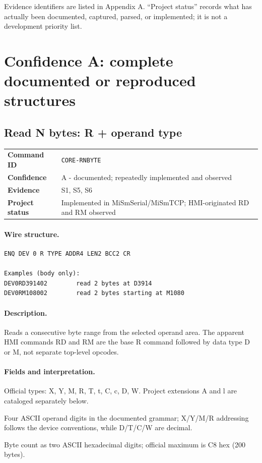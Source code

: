 \documentclass[10pt,letterpaper]{article}
\begin{document}
Evidence identifiers are listed in Appendix A. ``Project status'' records what has actually been documented, captured, parsed, or implemented; it is not a development priority list.


\section{Confidence A: complete documented or reproduced structures}

\subsection{Read N bytes: R + operand type}
\begin{tabularx}{\textwidth}{@{}>{\bfseries}p{2.8cm}X@{}}
Command ID & \texttt{CORE-RNBYTE} \\
Confidence & A - documented; repeatedly implemented and observed \\
Evidence & S1, S5, S6 \\
Project status & Implemented in MiSmSerial/MiSmTCP; HMI-originated RD and RM observed \\
\end{tabularx}
\vspace{0.35em}
\paragraph{Wire structure.}
\begin{Verbatim}[breaklines=true,breakanywhere=true,fontsize=\small]
ENQ DEV 0 R TYPE ADDR4 LEN2 BCC2 CR

Examples (body only):
DEV0RD391402        read 2 bytes at D3914
DEV0RM108002        read 2 bytes starting at M1080
\end{Verbatim}
\paragraph{Description.} Reads a consecutive byte range from the selected operand area. The apparent HMI commands RD and RM are the base R command followed by data type D or M, not separate top-level opcodes.
\paragraph{Fields and interpretation.}
\begin{description}[style=nextline,leftmargin=3.2cm,labelwidth=3.0cm,font=\normalfont\bfseries]
\item[TYPE] Official types: X, Y, M, R, T, t, C, c, D, W. Project extensions A and l are cataloged separately below.
\item[ADDR4] Four ASCII operand digits in the documented grammar; X/Y/M/R addressing follows the device conventions, while D/T/C/W are decimal.
\item[LEN2] Byte count as two ASCII hexadecimal digits; official maximum is C8 hex (200 bytes).
\end{description}
\end{document}
